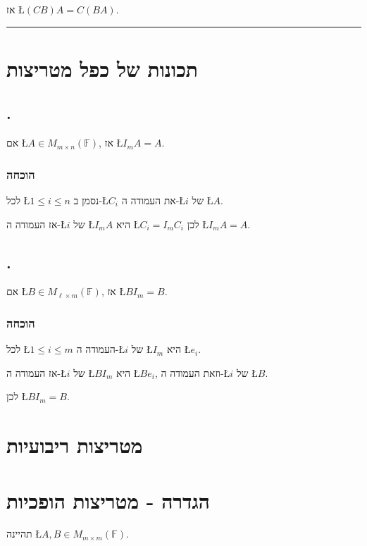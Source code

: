 \documentclass[english,hebrew]{article}
\begin{document}
אז \L{$(CB)A=C(BA)$}.\\

\rule[0.5ex]{1\columnwidth}{1pt}

\section{תכונות של כפל מטריצות}

\subsection{{\endL}.}

אם \L{$A\in M_{m\times n}(\mathbb{F})$}, אז \L{$I_{m}A=A$}.

\subsubsection{הוכחה}

לכל \L{$1\leq i\leq n$} נסמן ב-\L{$C_{i}$} את העמודה ה-\L{$i$}
של \L{$A$}.

אז העמודה ה-\L{$i$} של \L{$I_{m}A$} היא \L{$C_{i}=I_{m}C_{i}$}
לכן \L{$I_{m}A=A$}.

\subsection{{\endL}.}

אם \L{$B\in M_{\ell\times m}(\mathbb{F})$}, אז \L{$BI_{m}=B$}.

\subsubsection{הוכחה}

לכל \L{$1\leq i\leq m$} העמודה ה-\L{$i$} של \L{$I_{m}$} היא \L{$e_{i}$}.

אז העמודה ה-\L{$i$} של \L{$BI_{m}$} היא \L{$Be_{i}$}, וזאת העמודה
ה-\L{$i$} של \L{$B$}.

לכן \L{$BI_{m}=B$}.

\section{מטריצות ריבועיות}

\section{הגדרה - מטריצות הופכיות}

תהיינה \L{$A,B\in M_{m\times m}(\mathbb{F})$}.
\end{document}
